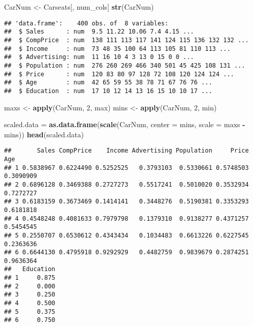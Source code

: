 \documentclass[
]{article}
\newenvironment{Shaded}{\begin{snugshade}}{\end{snugshade}}
\newcommand{\DataTypeTok}[1]{\textcolor[rgb]{0.13,0.29,0.53}{#1}}
\newcommand{\DecValTok}[1]{\textcolor[rgb]{0.00,0.00,0.81}{#1}}
\newcommand{\KeywordTok}[1]{\textcolor[rgb]{0.13,0.29,0.53}{\textbf{#1}}}
\newcommand{\NormalTok}[1]{#1}
\newcommand{\OperatorTok}[1]{\textcolor[rgb]{0.81,0.36,0.00}{\textbf{#1}}}
\newcommand{\StringTok}[1]{\textcolor[rgb]{0.31,0.60,0.02}{#1}}
\begin{document}
\begin{Shaded}
\begin{Highlighting}[]
\NormalTok{CarNum <-}\StringTok{ }\NormalTok{Carseats[, num_cols]}
\KeywordTok{str}\NormalTok{(CarNum)}
\end{Highlighting}
\end{Shaded}

\begin{verbatim}
## 'data.frame':    400 obs. of  8 variables:
##  $ Sales      : num  9.5 11.22 10.06 7.4 4.15 ...
##  $ CompPrice  : num  138 111 113 117 141 124 115 136 132 132 ...
##  $ Income     : num  73 48 35 100 64 113 105 81 110 113 ...
##  $ Advertising: num  11 16 10 4 3 13 0 15 0 0 ...
##  $ Population : num  276 260 269 466 340 501 45 425 108 131 ...
##  $ Price      : num  120 83 80 97 128 72 108 120 124 124 ...
##  $ Age        : num  42 65 59 55 38 78 71 67 76 76 ...
##  $ Education  : num  17 10 12 14 13 16 15 10 10 17 ...
\end{verbatim}

\begin{Shaded}
\begin{Highlighting}[]
\NormalTok{maxs <-}\StringTok{ }\KeywordTok{apply}\NormalTok{(CarNum, }\DecValTok{2}\NormalTok{, max) }
\NormalTok{mins <-}\StringTok{ }\KeywordTok{apply}\NormalTok{(CarNum, }\DecValTok{2}\NormalTok{, min)}


\NormalTok{scaled.data =}\StringTok{ }\KeywordTok{as.data.frame}\NormalTok{(}\KeywordTok{scale}\NormalTok{(CarNum, }\DataTypeTok{center =}\NormalTok{ mins, }\DataTypeTok{scale =}\NormalTok{ maxs }\OperatorTok{-}\StringTok{ }\NormalTok{mins))}
\KeywordTok{head}\NormalTok{(scaled.data)}
\end{Highlighting}
\end{Shaded}

\begin{verbatim}
##       Sales CompPrice    Income Advertising Population     Price       Age
## 1 0.5838967 0.6224490 0.5252525   0.3793103  0.5330661 0.5748503 0.3090909
## 2 0.6896128 0.3469388 0.2727273   0.5517241  0.5010020 0.3532934 0.7272727
## 3 0.6183159 0.3673469 0.1414141   0.3448276  0.5190381 0.3353293 0.6181818
## 4 0.4548248 0.4081633 0.7979798   0.1379310  0.9138277 0.4371257 0.5454545
## 5 0.2550707 0.6530612 0.4343434   0.1034483  0.6613226 0.6227545 0.2363636
## 6 0.6644130 0.4795918 0.9292929   0.4482759  0.9839679 0.2874251 0.9636364
##   Education
## 1     0.875
## 2     0.000
## 3     0.250
## 4     0.500
## 5     0.375
## 6     0.750
\end{verbatim}
\end{document}
